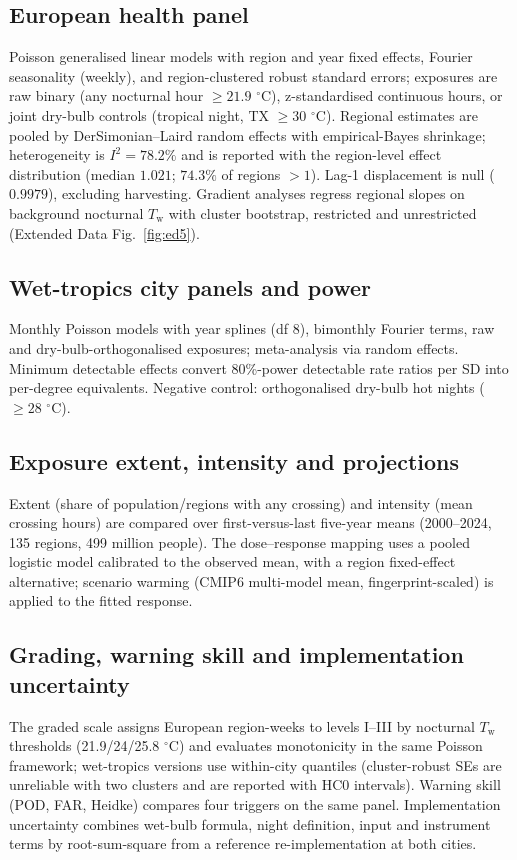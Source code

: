 \documentclass[12pt,a4paper]{article}
\newcommand{\dd}{\ensuremath{\,^{\circ}\mathrm{C}}}
\begin{document}
\subsection*{European health panel}
Poisson generalised linear models with region and year fixed effects, Fourier seasonality (weekly),
and region-clustered robust standard errors; exposures are raw binary (any nocturnal hour
$\geq21.9\,\dd$), z-standardised continuous hours, or joint dry-bulb controls (tropical night, TX
$\geq30\,\dd$). Regional estimates are pooled by DerSimonian--Laird random effects with
empirical-Bayes shrinkage; heterogeneity is $I^2=78.2\%$ and is reported with the region-level
effect distribution (median $1.021$; $74.3\%$ of regions $>1$). Lag-1 displacement is null
($0.9979$), excluding harvesting. Gradient analyses regress regional slopes on background nocturnal
$T_\mathrm{w}$ with cluster bootstrap, restricted and unrestricted (Extended Data
Fig.~\ref{fig:ed5}).

\subsection*{Wet-tropics city panels and power}
Monthly Poisson models with year splines (df 8), bimonthly Fourier terms, raw and
dry-bulb-orthogonalised exposures; meta-analysis via random effects. Minimum detectable effects
convert 80\%-power detectable rate ratios per SD into per-degree equivalents. Negative control:
orthogonalised dry-bulb hot nights ($\geq28\,\dd$).

\subsection*{Exposure extent, intensity and projections}
Extent (share of population/regions with any crossing) and intensity (mean crossing hours) are
compared over first-versus-last five-year means (2000--2024, 135 regions, 499 million people).
The dose--response mapping uses a pooled logistic model calibrated to the observed mean, with a
region fixed-effect alternative; scenario warming (CMIP6 multi-model mean, fingerprint-scaled) is
applied to the fitted response.

\subsection*{Grading, warning skill and implementation uncertainty}
The graded scale assigns European region-weeks to levels I--III by nocturnal $T_\mathrm{w}$
thresholds (21.9/24/25.8\,\dd) and evaluates monotonicity in the same Poisson framework;
wet-tropics versions use within-city quantiles (cluster-robust SEs are unreliable with two clusters
and are reported with HC0 intervals). Warning skill (POD, FAR, Heidke) compares four triggers on
the same panel. Implementation uncertainty combines wet-bulb formula, night definition, input and
instrument terms by root-sum-square from a reference re-implementation at both cities.
\end{document}
